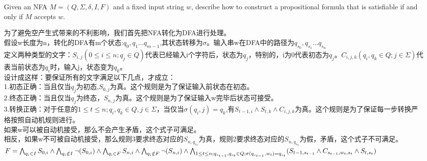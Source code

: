 \documentclass[11pt,a4paper]{article}
\begin{document}
		\subproblem Given an NFA $M=(Q, \Sigma, \delta, I, F)$ and a fixed input string $w$,
		describe how to construct a propositional formula that is satisfiable if and only if $M$ accepts $w$.
		
		
		\begin{solution}
		为了避免空产生式带来的不利影响，我们首先把NFA转化为DFA进行处理。\\
		假设w长度为n，转化的DFA有m个状态:$q_{0},q_{1}...q_{m-1}$,其状态转移为$\sigma$。输入串w在DFA中的路径为$q_{s_{0}},q_{s_{1}}...q_{s_{n}}$\\
		定义两种类型的文字：$S_{i,j}(0 \leq i \leq n; q_{j} \in Q)$代表已经输入i个字符后，状态为$q_{j}$，特别的，i为0代表初态为$q_{j}$。$C_{i,j,k}(q_{i}, q_{k} \in Q; j \in \Sigma)$代表当前状态为$q_{i}$时，输入j，状态变为$q_{k}$。\\
		设计成这样：要保证所有的文字满足以下几点，才成立：\\
		1.初态正确：当且仅当$q_{j}$为初态,$S_{0,j}$为真。这个规则是为了保证输入前状态在初态。\\
		2.终态正确：当且仅当$q_{j}$为终态，$S_{n,j}$为真。这个规则是为了保证输入w完毕后状态可接受。\\
		3.转换正确：对于任意的$1 \leq t \leq n; q_{i},q_{k} \in Q, j \in \Sigma$，当仅当$\sigma(q_{i},j)=q_{k}$,有$S_{t-1,i} \land S_{t,k} \land C_{i,j,k}$为真。这个规则是为了保证每一步转换严格按照自动机规则进行。\\
		如果w可以被自动机接受，那么不会产生矛盾，这个式子可满足。\\
		相反，如果w不可被自动机接受，那么规则3要求终态对应的$S_{n,q_{s_{n}}}$为真，规则2要求终态对应的$S_{n,q_{s_{n}}}$为假，矛盾，这个式子不可满足。
		$F = \bigwedge_{q_{i} \in I}S_{0,i} \\
		\land \bigwedge_{q_{i} \notin I}\lnot(S_{0,i}) \\
		\land \bigwedge_{q_{i} \in F}S_{n,i} \\
		\land \bigwedge_{q_{i} \notin F}\lnot(S_{n,i}) \\
		\land \bigwedge_{1 \leq t \leq n;q_{s_{t-1}}, q_{s_{t}} \in Q; \sigma(q_{s_{t-1}},w_{t})=q_{s_{t}}}(S_{t - 1,s_{t-1}} \land C_{s_{t-1}, w_{t}, s_{t}} \land S_{t, s_{t}}) \\
		$
		\end{solution}
		
\end{document}
